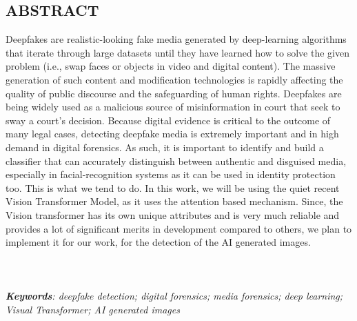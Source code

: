 \begin{center}


    \section*{ABSTRACT}
    \justify
    Deepfakes are realistic-looking fake media generated by deep-learning algorithms that iterate through large datasets until
    they have learned how to solve the given problem (i.e., swap faces or objects in video and digital content). The massive generation
    of such content and modification technologies is rapidly affecting the quality of public discourse and the safeguarding of
    human rights. Deepfakes are being widely used as a malicious source of misinformation in court that seek to sway a court’s decision.
    Because digital evidence is critical to the outcome of many legal cases, detecting deepfake media is extremely important and in high demand in digital forensics.
    As such, it is important to identify and build a classifier that can accurately distinguish between authentic and disguised media, especially in facial-recognition systems
    as it can be used in identity protection too. This is what we tend to do. In this work,
    we will be using the quiet recent Vision Transformer Model, as it uses the attention based mechanism. Since, the Vision transformer has its own unique attributes and is very much reliable and provides a lot of significant merits in development compared to others, we plan to implement it for our work, for the detection of the AI generated images.\\
    \\
    \\
    \\ \textit{\textbf{Keywords}: deepfake detection; digital forensics; media forensics; deep learning; Visual Transformer; AI generated images}


\end{center}